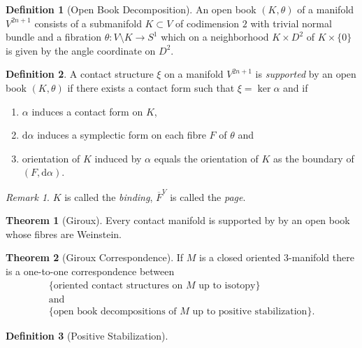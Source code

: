 \documentclass[a4paper]{article}
\newcommand{\dd}{\mathrm{d}}
\newcommand{\lra}{\longrightarrow}
\newcommand{\ol}[1]{\overline{#1}}
\theoremstyle{definition}
\newtheorem{thm}{Theorem}
\theoremstyle{definition}
\newtheorem{definition}{Definition}
\theoremstyle{remark}
\newtheorem{rmk}{Remark}
\theoremstyle{remark}
\theoremstyle{remark}
\begin{document}
\begin{definition}[Open Book Decomposition]
  An open book $(K,\theta)$ of a manifold $V^{2n+1}$ consists of a submanifold $K\subset V$ of codimension $2$ with trivial normal bundle and a fibration $\theta:V\setminus K\lra S^1$ which on a neighborhood $K\times D^2$ of $K\times\{0\}$ is given by the angle coordinate on $D^2$.
\end{definition}

\begin{definition}
  A contact structure $\xi$ on a manifold $V^{2n+1}$ is \emph{supported} by an open book $(K,\theta)$ if there exists a contact form such that $\xi=\ker\alpha$ and if
  \begin{enumerate}
    \item $\alpha$ induces a contact form on $K$,
    \item $\dd\alpha$ induces a symplectic form on each fibre $F$ of $\theta$ and
    \item orientation of $K$ induced by $\alpha$ equals the orientation of $K$ as the boundary of $(F,\dd\alpha)$.
  \end{enumerate}
\end{definition}

\begin{rmk}
  $K$ is called the \emph{binding},  $\ol{F}^V$ is called the \emph{page}.
\end{rmk}

\begin{thm}[Giroux]
  Every contact manifold is supported by by an open book whose fibres are Weinstein.
\end{thm}

\begin{thm}[Giroux Correspondence]
  If $M$ is a closed oriented $3$-manifold there is a one-to-one correspondence between 
  \begin{gather*}
    \{\text{oriented contact structures on $M$ up to isotopy}\} \\
    \text{and} \\
    \{\text{open book decompositions of $M$ up to positive stabilization}\}.
  \end{gather*}
\end{thm}

\begin{definition}[Positive Stabilization]
  
\end{definition}
\end{document}
